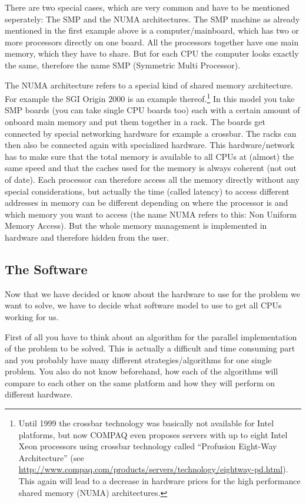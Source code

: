 There are two special cases, which are very common and have to be mentioned
seperately: The SMP and the NUMA architectures. The SMP machine as 
already mentioned in the first example above is a computer/mainboard,
which has two or more processors directly on one board. All the processors 
together have one main memory, which they have to share. But for each
CPU the computer looks exactly the same, therefore the name SMP 
(Symmetric Multi Processor).

The NUMA architecture refers to a special kind of shared memory architecture.
For example the SGI Origin 2000 is an example 
thereof.\footnote{Until 1999 the crossbar technology was 
basically not available for Intel platforms, but now COMPAQ even proposes
servers with up to eight Intel Xeon processors using crossbar technology
called ``Profusion Eight-Way Architecture''
(see \href{http://www.compaq.com/products/servers/technology/eightway-pd.html}%
{http://www.compaq.com/products/servers/technology/eightway-pd.html}). 
This again will lead to a decrease in hardware prices for the high performance
shared memory (NUMA) architectures.} 
In this model
you take SMP boards (you can take single CPU boards too) each with
a certain amount of onboard main memory and 
put them together in a rack. The boards get connected by special
networking hardware for example a crossbar. The racks can then
also be connected again with specialized hardware. This hardware/network
has to make sure that the total memory is available to all CPUs at
(almost) the same speed and that the caches used for the memory
is always coherent (not out of date). Each processor can therefore
access all the memory directly without any special considerations, but
actually the time (called latency) to access different addresses in
memory can be different depending on where the processor is and
which memory you want to access (the name NUMA refers to this: Non Uniform 
Memory Access). But the whole memory management is
implemented in hardware and therefore hidden from the user.


\subsection{The Software}
Now that we have decided or know about the hardware to use
for the problem we want to solve, we have to decide what software
model to use to get all CPUs working for us.  

First of all you have to think about an algorithm for the parallel
implementation of the problem to be solved. This is actually a 
difficult and time consuming part and you probably have many different
strategies/algorithms for one single problem. 
You also do not know beforehand, how
each of the algorithms will compare to each other on the
same platform and  how they will perform on different hardware.

